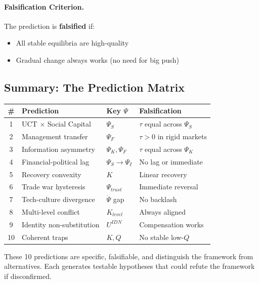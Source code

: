 \documentclass[12pt,a4paper]{article}
\begin{document}
\paragraph{Falsification Criterion.}
The prediction is \textbf{falsified} if:
\begin{itemize}
    \item All stable equilibria are high-quality
    \item Gradual change always works (no need for big push)
\end{itemize}

\subsection{Summary: The Prediction Matrix}

\begin{center}
\renewcommand{\arraystretch}{1.2}
\begin{tabular}{clll}
\hline
\textbf{\#} & \textbf{Prediction} & \textbf{Key $\Psi$} & \textbf{Falsification} \\
\hline
1 & UCT $\times$ Social Capital & $\Psi_S$ & $\tau$ equal across $\Psi_S$ \\
2 & Management transfer & $\Psi_F$ & $\tau > 0$ in rigid markets \\
3 & Information asymmetry & $\Psi_K, \Psi_F$ & $\tau$ equal across $\Psi_K$ \\
4 & Financial-political lag & $\Psi_S \to \Psi_I$ & No lag or immediate \\
5 & Recovery convexity & $K$ & Linear recovery \\
6 & Trade war hysteresis & $\Psi_{trust}$ & Immediate reversal \\
7 & Tech-culture divergence & $\dot{\Psi}$ gap & No backlash \\
8 & Multi-level conflict & $K_{level}$ & Always aligned \\
9 & Identity non-substitution & $U^{IDN}$ & Compensation works \\
10 & Coherent traps & $K, Q$ & No stable low-$Q$ \\
\hline
\end{tabular}
\end{center}

These 10 predictions are specific, falsifiable, and distinguish the framework from alternatives. Each generates testable hypotheses that could refute the framework if disconfirmed.

\end{document}
